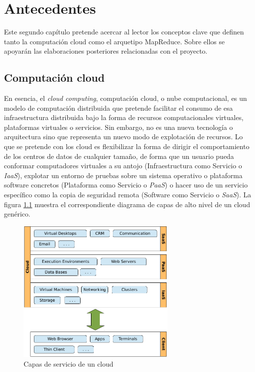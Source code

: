 \chapter{Antecedentes}\label{cap:estadodelarte}

\noindent Este segundo cap\'itulo pretende acercar al lector los conceptos clave que definen tanto  la computaci\'on cloud como el arquetipo MapReduce. Sobre ellos se apoyar\'an las elaboraciones posteriores relacionadas con el proyecto.


\section{Computaci\'on cloud}\label{sec:computacioncloud}
\noindent En esencia, el \emph{cloud computing}, computaci\'on cloud, o nube computacional, es un modelo de computaci\'on distribuida que pretende facilitar el consumo de esa infraestructura distribuida bajo la forma de recursos computacionales virtuales, plataformas virtuales o servicios. Sin embargo, no es una nueva tecnolog\'ia o arquitectura sino que representa un nuevo modo de explotaci\'on de recursos. Lo que se pretende con los cloud es flexibilizar la forma de dirigir el comportamiento de los centros de datos de cualquier tama\~no, de forma que un usuario pueda conformar computadores virtuales a su antojo (Infraestructura como Servicio o \emph{IaaS}), explotar un entorno de pruebas sobre un sistema operativo o plataforma software concretos (Plataforma como Servicio o \emph{PaaS}) o hacer uso de un servicio espec\'ifico como la copia de seguridad remota (Software como Servicio o \emph{SaaS}). La figura \ref{fig:cloudlayers} muestra el correspondiente diagrama de capas de alto nivel de un cloud gen\'erico.\newline

\begin{figure}[tbp]
\begin{center}
\includegraphics[width=0.69\textwidth]{imagenes/003.pdf}
 \caption{Capas de servicio de un cloud}
\label{fig:cloudlayers}
\end{center}
\end{figure}

